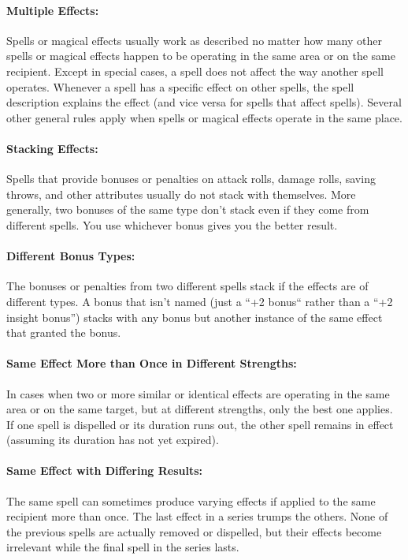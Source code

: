 \documentclass[../VancianToPsionics.tex]{subfiles}
\begin{document}
\paragraph{Multiple Effects:} Spells or magical effects usually work as described no matter how many other spells or magical effects happen to be operating in the same area or on the same recipient. Except in special cases, a spell does not affect the way another spell operates. Whenever a spell has a specific effect on other spells, the spell description explains the effect (and vice versa for spells that affect spells). Several other general rules apply when spells or magical effects operate in the same place.

\paragraph{Stacking Effects:} Spells that provide bonuses or penalties on attack rolls, damage rolls, saving throws, and other attributes usually do not stack with themselves. More generally, two bonuses of the same type don't stack even if they come from different spells. You use whichever bonus gives you the better result. 

\paragraph{Different Bonus Types:} The bonuses or penalties from two different spells stack if the effects are of different types. A bonus that isn't named (just a ``+2 bonus`` rather than a ``+2 insight bonus'') stacks with any bonus but another instance of the same effect that granted the bonus.

\paragraph{Same Effect More than Once in Different Strengths:} 
In cases when two or more similar or identical effects are operating in the same area or on the same target, but at different strengths, only the best one applies. If one spell is dispelled or its duration runs out, the other spell remains in effect (assuming its duration has not yet expired).

\paragraph{Same Effect with Differing Results:} 
The same spell can sometimes produce varying effects if applied to the same recipient more than once. The last effect in a series trumps the others. None of the previous spells are actually removed or dispelled, but their effects become irrelevant while the final spell in the series lasts.
\end{document}
